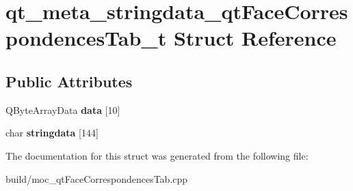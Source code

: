 \hypertarget{structqt__meta__stringdata__qt_face_correspondences_tab__t}{}\section{qt\+\_\+meta\+\_\+stringdata\+\_\+qt\+Face\+Correspondences\+Tab\+\_\+t Struct Reference}
\label{structqt__meta__stringdata__qt_face_correspondences_tab__t}
\subsection*{Public Attributes}
\begin{DoxyCompactItemize}
\item 
\hypertarget{structqt__meta__stringdata__qt_face_correspondences_tab__t_a151502309f3066d07ad8d300eb42c205}{}Q\+Byte\+Array\+Data {\bfseries data} \mbox{[}10\mbox{]}\label{structqt__meta__stringdata__qt_face_correspondences_tab__t_a151502309f3066d07ad8d300eb42c205}

\item 
\hypertarget{structqt__meta__stringdata__qt_face_correspondences_tab__t_af7f8347153e6b23351daf6fd1b82f16a}{}char {\bfseries stringdata} \mbox{[}144\mbox{]}\label{structqt__meta__stringdata__qt_face_correspondences_tab__t_af7f8347153e6b23351daf6fd1b82f16a}

\end{DoxyCompactItemize}


The documentation for this struct was generated from the following file\+:\begin{DoxyCompactItemize}
\item 
build/moc\+\_\+qt\+Face\+Correspondences\+Tab.\+cpp\end{DoxyCompactItemize}
